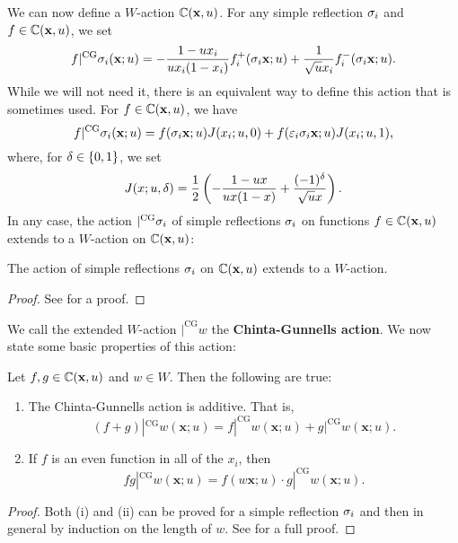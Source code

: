         We can now define a $W$-action $\mathbb{C}(\mathbf{x},u)$. For any simple reflection $\sigma_{i}$ and $f \in \mathbb{C}(\mathbf{x},u)$, we set
        \[
            f|^{\mathrm{CG}}\sigma_{i}(\mathbf{x};u) = -\frac{1-ux_{i}}{ux_{i}(1-x_{i})}f_{i}^{+}(\sigma_{i}\mathbf{x};u)+\frac{1}{\sqrt{u}x_{i}}f_{i}^{-}(\sigma_{i}\mathbf{x};u).
        \]
        While we will not need it, there is an equivalent way to define this action that is sometimes used. For $f \in \mathbb{C}(\mathbf{x},u)$, we have
        \[
            f|^{\mathrm{CG}}\sigma_{i}(\mathbf{x};u) = f(\sigma_{i}\mathbf{x};u)J(x_{i};u,0)+f(\varepsilon_{i}\sigma_{i}\mathbf{x};u)J(x_{i};u,1),
        \]
        where, for $\delta \in \{0,1\}$, we set
        \[
            J(x;u,\delta) = \frac{1}{2}\left(-\frac{1-ux}{ux(1-x)}+\frac{(-1)^{\delta}}{\sqrt{u}x}\right).
        \]
        In any case, the action $|^{\mathrm{CG}}\sigma_{i}$ of simple reflections $\sigma_{i}$ on functions $f \in \mathbb{C}(\mathbf{x},u)$ extends to a $W$-action on $\mathbb{C}(\mathbf{x},u)$:

        \begin{proposition}
        The action of simple reflections $\sigma_{i}$ on $\mathbb{C}(\mathbf{x},u)$ extends to a $W$-action.
        \end{proposition}
        \begin{proof}
            See \cite{chinta2007weyl} for a proof.
        \end{proof}
 
        We call the extended $W$-action $|^{\mathrm{CG}}w$ the \textbf{Chinta-Gunnells action}. We now state some basic properties of this action:

        \begin{proposition}\label{prop:CG_properties}
            Let $f,g \in \mathbb{C}(\mathbf{x},u)$ and $w \in W$. Then the following are true:
            \begin{enumerate}[label=(\roman*)]
                \item The Chinta-Gunnells action is additive. That is,
                \[
                    (f+g)|^{\mathrm{CG}}w(\mathbf{x};u) = f|^{\mathrm{CG}}w(\mathbf{x};u)+g|^{\mathrm{CG}}w(\mathbf{x};u).
                \]
                \item If $f$ is an even function in all of the $x_{i}$, then
                \[
                    fg|^{\mathrm{CG}}w(\mathbf{x};u) = f(w\mathbf{x};u) \cdot g|^{\mathrm{CG}}w(\mathbf{x};u).
                \]
            \end{enumerate}
        \end{proposition}
        \begin{proof}
            Both (i) and (ii) can be proved for a simple reflection $\sigma_{i}$ and then in general by induction on the length of $w$. See \cite{chinta2008parts} for a full proof.
        \end{proof}
